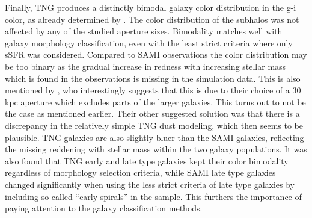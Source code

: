 Finally, TNG produces a distinctly bimodal galaxy color distribution in the g-i color, as already determined by \textcite{Nelson2017}. The color distribution of the subhalos was not affected by any of the studied aperture sizes. Bimodality matches well with galaxy morphology classification, even with the least strict criteria where only sSFR was considered. Compared to SAMI observations the color distribution may be too binary as the gradual increase in redness with increasing stellar mass which is found in the observations is missing in the simulation data. This is also mentioned by \textcite{Nelson2017}, who interestingly suggests that this is due to their choice of a 30 kpc aperture which excludes parts of the larger galaxies. This turns out to not be the case as mentioned earlier. Their other suggested solution was that there is a discrepancy in the relatively simple TNG dust modeling, which then seems to be plausible. TNG galaxies are also slightly bluer than the SAMI galaxies, reflecting the missing reddening with stellar mass within the two galaxy populations. It was also found that TNG early and late type galaxies kept their color bimodality regardless of morphology selection criteria, while SAMI late type galaxies changed significantly when using the less strict criteria of late type galaxies by including so-called ``early spirals'' in the sample. This furthers the importance of paying attention to the galaxy classification methods.


